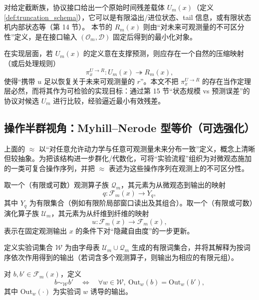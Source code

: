 \begin{remark}[原始残差载体与有效残差的关系]\label{rem:U_to_R}
\AuditTag
对给定截断族，协议接口给出一个原始时间残差载体 $U_m(x)$（定义 \ref{def:truncation_schema}），它可以是有限溢出/进位状态、tail 信息，或有限状态机内部状态等（第 14 节）。
本节的 $R_m(x)$ 则由“对未来可观测量的不可区分性”定义，是在接口输入 $(\mathcal O_m,\mathcal D)$ 固定后得到的最小化对象。\par

在实现层面，若 $U_m(x)$ 的定义意在支撑预测，则应存在一个自然的压缩映射（或后处理规则）
$$
\pi^{U\to R}_x:U_m(x)\twoheadrightarrow R_m(x),
$$
使得“携带 $u$ 足以恢复关于未来可观测量的 $r$”。本文不把 $\pi^{U\to R}_x$ 的存在当作定理层必然，而将其作为可检验的实现目标：通过第 15 节“状态规模 vs 预测误差”的协议对候选 $U_m$ 进行比较，经验逼近最小有效残差。
\end{remark}

\subsection{操作半群视角：Myhill--Nerode 型等价（可选强化）}

上面的 $\approx$ 以“对任意允许动力学与任意可观测量未来分布一致”定义，概念上清晰但较抽象。为把该结构进一步群化/代数化，可将“实验流程”组织为对微观态施加的一类可复合操作序列，并把 $\approx$ 表述为这些操作序列在观测上的不可区分性。

\begin{definition}[观测算子与实验词]\label{def:experiment-words}
取一个（有限或可数）观测算子族 $\mathcal Q_m$，其元素为从微观态到输出的映射
$$
q:\mathcal F_m(x)\to Y_q,
$$
其中 $Y_q$ 为有限集合（例如有限阶局部窗口读出及其组合）。取一个（有限或可数）演化算子族 $\mathcal U_m$，其元素为从纤维到纤维的映射
$$
u:\mathcal F_m(x)\to \mathcal F_m(x),
$$
表示在固定观测输出 $x$ 的条件下对“隐藏自由度”的一步更新。\par

定义实验词集合 $\mathcal W$ 为由字母表 $\mathcal U_m\cup \mathcal Q_m$ 生成的有限词集合，并将其解释为按词序依次作用得到的输出（若词含多个观测算子，则输出为相应的有限元组）。
\end{definition}

\begin{definition}\label{def:mn-equivalence}
对 $b,b'\in\mathcal F_m(x)$，定义
$$
b\sim_{\mathcal W} b'
\quad\Longleftrightarrow\quad
\forall w\in\mathcal W,\ \mathrm{Out}_w(b)=\mathrm{Out}_w(b'),
$$
其中 $\mathrm{Out}_w(\cdot)$ 为实验词 $w$ 诱导的输出。
\end{definition}

